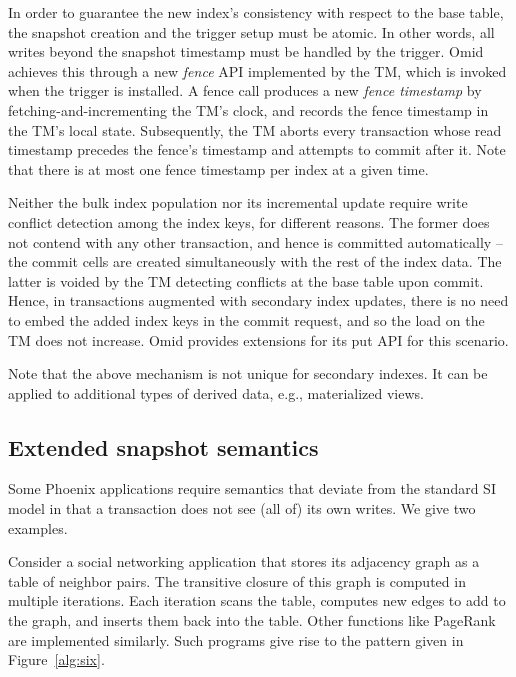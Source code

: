 In order to guarantee the new index's consistency with respect to the base table, the snapshot creation 
and the trigger setup must be atomic. In other words, all writes beyond the snapshot   
timestamp must be handled by the trigger. Omid achieves this through a new {\em fence\/} API
implemented by the TM, which is  invoked when the trigger is installed. 
A fence call produces a new \emph{fence timestamp} by fetching-and-incrementing the TM's clock, and 
records the fence timestamp in the TM's local state.  
Subsequently, the TM aborts every transaction whose read timestamp precedes the fence's 
timestamp and attempts to commit after it. 
Note that there is at most one fence timestamp per index at a given time.


Neither the bulk index population nor its incremental update require write conflict detection 
among the index keys, for different reasons. The former does not contend with any other 
transaction, and hence is committed automatically -- the commit cells are created simultaneously
with the rest of the index data. The latter is voided by the TM detecting conflicts at the base 
table upon commit. Hence, in transactions augmented with secondary index updates,  
there is no need to embed the added index keys in the commit 
request, and so the load on the TM does not increase. 
Omid provides extensions for its put API for this scenario. 

Note that the above mechanism is not unique for secondary indexes. 
It can be applied to additional types of derived data, e.g., materialized views. 

\subsection{Extended snapshot semantics}
\label{ssec:snapshot}

Some Phoenix applications require semantics that  
deviate from the standard SI model in that a transaction does not see (all of) its own writes.
We give two examples. 

Consider a social networking application that stores its adjacency graph 
as a table of neighbor pairs. The transitive closure of this graph is computed in
multiple iterations. Each iteration scans the table, computes new edges to add to the 
graph, and inserts them back into the table. Other functions like PageRank are implemented
similarly. Such programs give rise to the pattern given in Figure~\ref{alg:six}. 


